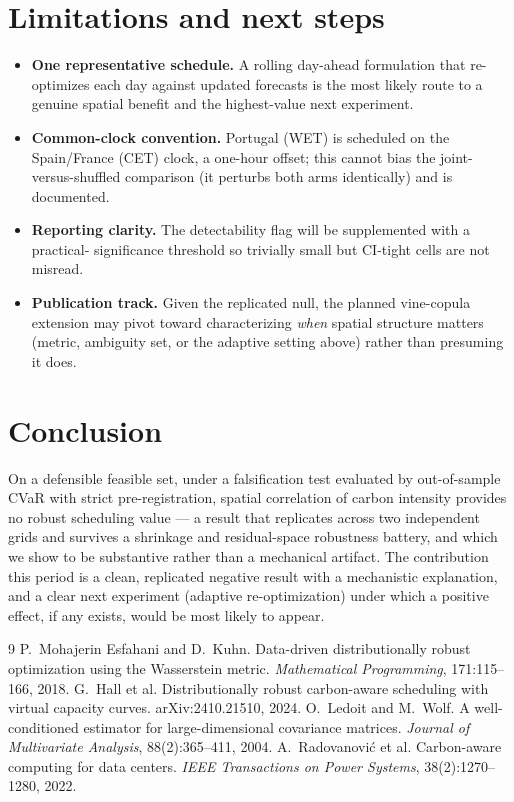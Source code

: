 \documentclass[11pt]{article}
\begin{document}
\section{Limitations and next steps}
\begin{itemize}[leftmargin=1.4em,itemsep=2pt]
  \item \textbf{One representative schedule.} A rolling day-ahead formulation that re-optimizes each day
  against updated forecasts is the most likely route to a genuine spatial benefit and the highest-value
  next experiment.
  \item \textbf{Common-clock convention.} Portugal (WET) is scheduled on the Spain/France (CET) clock, a
  one-hour offset; this cannot bias the joint-versus-shuffled comparison (it perturbs both arms
  identically) and is documented.
  \item \textbf{Reporting clarity.} The detectability flag will be supplemented with a practical-
  significance threshold so trivially small but CI-tight cells are not misread.
  \item \textbf{Publication track.} Given the replicated null, the planned vine-copula extension may
  pivot toward characterizing \emph{when} spatial structure matters (metric, ambiguity set, or the
  adaptive setting above) rather than presuming it does.
\end{itemize}

\section{Conclusion}
On a defensible feasible set, under a falsification test evaluated by out-of-sample CVaR with strict
pre-registration, spatial correlation of carbon intensity provides no robust scheduling value --- a
result that replicates across two independent grids and survives a shrinkage and residual-space
robustness battery, and which we show to be substantive rather than a mechanical artifact. The
contribution this period is a clean, replicated negative result with a mechanistic explanation, and a
clear next experiment (adaptive re-optimization) under which a positive effect, if any exists, would be
most likely to appear.

\begin{thebibliography}{9}
 P.~Mohajerin Esfahani and D.~Kuhn. Data-driven distributionally robust
optimization using the Wasserstein metric. \emph{Mathematical Programming}, 171:115--166, 2018.
 G.~Hall et al. Distributionally robust carbon-aware scheduling with virtual capacity
curves. arXiv:2410.21510, 2024.
 O.~Ledoit and M.~Wolf. A well-conditioned estimator for large-dimensional
covariance matrices. \emph{Journal of Multivariate Analysis}, 88(2):365--411, 2004.
 A.~Radovanovi\'c et al. Carbon-aware computing for data centers.
\emph{IEEE Transactions on Power Systems}, 38(2):1270--1280, 2022.
\end{thebibliography}
\end{document}

